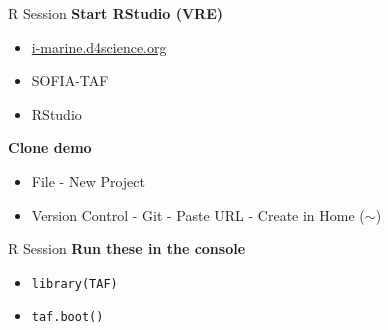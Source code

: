 \documentclass[aspectratio=169]{beamer}
\begin{document}

\begin{frame}{R Session}
  \textbf{\darkgreen Start RStudio (VRE)}\\[0.3ex]
  \begin{itemize}
    \item[] {\blue\href{https://i-marine.d4science.org/}%
      {i-marine.d4science.org}}\\[1ex]
    \item[] SOFIA-TAF\\[1ex]
    \item[] RStudio\\[1ex]
  \end{itemize}
  \vspace{4ex}
  \textbf{\darkgreen Clone demo}\\[0.3ex]
  \begin{itemize}
    \item[] File - New Project\\[1ex]
    \item[] Version Control - Git - Paste URL - Create in Home ($\sim$)\\[1ex]
  \end{itemize}
\end{frame}


\begin{frame}[fragile]{R Session}
  \textbf{\darkgreen Run these in the console}\\[0.3ex]
  \begin{itemize}
    \item[] \verb|library(TAF)|\\[1ex]
    \item[] \verb|taf.boot()|\\[1ex]
  \end{itemize}
\end{frame}

\end{document}
